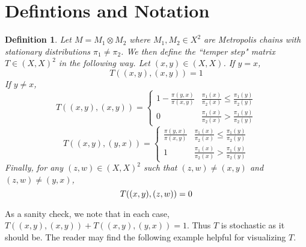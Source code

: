 \documentclass{amsart}
\newtheorem{definition}{Definition}[section]
\newcommand{\1}{\mathbbm{1}}
\begin{document}
\section{Defintions and Notation}
\begin{definition}{\label{def:T}}
    Let $M=M_1\otimes M_2$ where $M_1,M_2\in X^2$ are Metropolis chains with stationary distributions $\pi_1\neq \pi_2$. We then define the ``temper step" matrix $T\in (X,X)^2$ in the following way. Let $(x,y)\in (X,X)$. If $y=x$,
    \begin{equation}
        T((x,y),(x,y))=1
    \end{equation}
    If $y\neq x$,
    \begin{equation}
        T((x,y),(x,y))=\begin{cases}
            1-\frac{\pi(y,x)}{\pi(x,y)} & \frac{\pi_1(x)}{\pi_2(x)}\leq \frac{\pi_1(y)}{\pi_2(y)}\\[5pt]
            0 & \frac{\pi_1(x)}{\pi_2(x)}> \frac{\pi_1(y)}{\pi_2(y)}
        \end{cases}
    \end{equation}
    \begin{equation}
        T((x,y),(y,x))=\begin{cases}
            \frac{\pi(y,x)}{\pi(x,y)} & \frac{\pi_1(x)}{\pi_2(x)}\leq \frac{\pi_1(y)}{\pi_2(y)}\\[5pt]
            1 & \frac{\pi_1(x)}{\pi_2(x)}> \frac{\pi_1(y)}{\pi_2(y)}
        \end{cases}
    \end{equation}
    Finally, for any $(z,w)\in(X,X)^2$ such that $(z,w)\neq (x,y)$ and $(z,w)\neq (y,x)$,
    \begin{equation}{\label{eq:T0}}
        T((x,y),(z,w))=0
    \end{equation}
\end{definition}
As a sanity check, we note that in each case, $T((x,y),(x,y))+T((x,y),(y,x))=1$. Thus $T$ is stochastic as it should be. The reader may find the following example helpful for visualizing $T$. 
\end{document}

